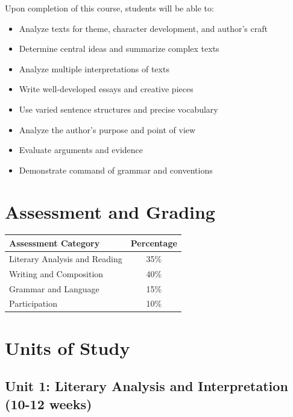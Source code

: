 \documentclass[11pt,letterpaper]{report}
\begin{document}
Upon completion of this course, students will be able to:

\begin{itemize}
    \item Analyze texts for theme, character development, and author's craft
    \item Determine central ideas and summarize complex texts
    \item Analyze multiple interpretations of texts
    \item Write well-developed essays and creative pieces
    \item Use varied sentence structures and precise vocabulary
    \item Analyze the author's purpose and point of view
    \item Evaluate arguments and evidence
    \item Demonstrate command of grammar and conventions
\end{itemize}

\section{Assessment and Grading}

\begin{center}
\begin{tabular}{|l|c|}
\hline
\textbf{Assessment Category} & \textbf{Percentage} \\
\hline
Literary Analysis and Reading & 35\% \\
\hline
Writing and Composition & 40\% \\
\hline
Grammar and Language & 15\% \\
\hline
Participation & 10\% \\
\hline
\end{tabular}
\end{center}

\section{Units of Study}

\subsection{Unit 1: Literary Analysis and Interpretation (10-12 weeks)}
\end{document}
